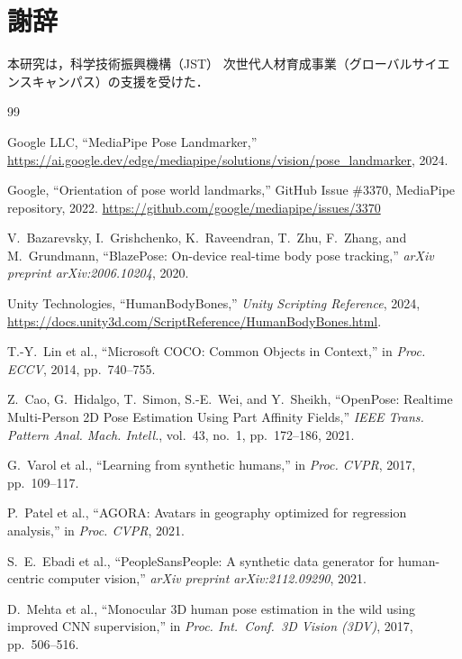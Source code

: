 \documentclass[twocolumn]{article}
\begin{document}
\section*{謝辞}

本研究は，科学技術振興機構（JST）
次世代人材育成事業（グローバルサイエンスキャンパス）の支援を受けた．

\begin{thebibliography}{99}

Google LLC, ``MediaPipe Pose Landmarker,''
\url{https://ai.google.dev/edge/mediapipe/solutions/vision/pose_landmarker},
2024.

Google, ``Orientation of pose world landmarks,''
GitHub Issue \#3370, MediaPipe repository, 2022.
\url{https://github.com/google/mediapipe/issues/3370}

V.~Bazarevsky, I.~Grishchenko, K.~Raveendran, T.~Zhu, F.~Zhang,
and M.~Grundmann,
``BlazePose: On-device real-time body pose tracking,''
\textit{arXiv preprint arXiv:2006.10204}, 2020.

Unity Technologies, ``HumanBodyBones,''
\textit{Unity Scripting Reference}, 2024,
\url{https://docs.unity3d.com/ScriptReference/HumanBodyBones.html}.

T.-Y.~Lin et al.,
``Microsoft COCO: Common Objects in Context,''
in \textit{Proc. ECCV}, 2014, pp.~740--755.

Z.~Cao, G.~Hidalgo, T.~Simon, S.-E.~Wei, and Y.~Sheikh,
``OpenPose: Realtime Multi-Person 2D Pose Estimation Using Part Affinity
Fields,''
\textit{IEEE Trans. Pattern Anal. Mach. Intell.}, vol.~43, no.~1,
pp.~172--186, 2021.

G.~Varol et al.,
``Learning from synthetic humans,''
in \textit{Proc. CVPR}, 2017, pp.~109--117.

P.~Patel et al.,
``AGORA: Avatars in geography optimized for regression analysis,''
in \textit{Proc. CVPR}, 2021.

S.~E.~Ebadi et al.,
``PeopleSansPeople: A synthetic data generator for human-centric
computer vision,''
\textit{arXiv preprint arXiv:2112.09290}, 2021.

D.~Mehta et al.,
``Monocular 3D human pose estimation in the wild using improved CNN
supervision,''
in \textit{Proc. Int.\ Conf.\ 3D Vision (3DV)}, 2017, pp.~506--516.


\end{thebibliography}
\end{document}
